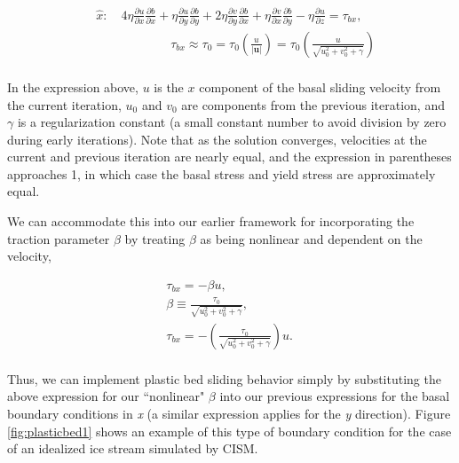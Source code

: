 \begin{align*}
  & \hat{x}:\quad 4\eta \frac{\partial u}{\partial x}\frac{\partial b}{\partial x}+\eta \frac{\partial u}{\partial y}\frac{\partial b}{\partial y}+2\eta \frac{\partial v}{\partial y}\frac{\partial b}{\partial x}+\eta \frac{\partial v}{\partial x}\frac{\partial b}{\partial y}-\eta \frac{\partial u}{\partial z}=\tau _{bx}, \\ 
 & \quad \quad \quad \quad \quad \quad \tau _{bx}\approx \tau _{0}=\tau _{0}\left( \frac{u}{\left| \mathbf{u} \right|} \right)=\tau _{0}\left( \frac{u}{\sqrt{u_{0}^{2}+v_{0}^{2}+\gamma }} \right) \\ 
\end{align*}

In the expression above, $u$ is the $x$ component of the basal sliding velocity from the current iteration, $u_0$ and $v_0$ are components from the previous iteration, and $\gamma$ is a regularization constant (a small constant number to avoid division by zero during early iterations). Note that as the solution converges, velocities at the current and previous iteration are nearly equal, and the expression in parentheses approaches 1, in which case the basal stress and yield stress are approximately equal. 

We can accommodate this into our earlier framework for incorporating the traction parameter $\beta$ by treating $\beta$ as being nonlinear and dependent on the velocity,

\begin{align*}
  & \tau _{bx}=-\beta u,\quad \quad  \\ 
 & \beta \equiv \frac{\tau _{0}}{\sqrt{u_{0}^{2}+v_{0}^{2}+\gamma }},\quad  \\ 
 & \tau _{bx}=-\left( \frac{\tau _{0}}{\sqrt{u_{0}^{2}+v_{0}^{2}+\gamma }} \right)u.\quad  \\
\end{align*}

Thus, we can implement plastic bed sliding behavior simply by substituting the above expression for our ``nonlinear" \textit{{\large \(\beta{}\)}} into our previous expressions for the basal boundary conditions in \textit{x} (a similar expression applies for the \textit{y} direction). 
Figure \ref{fig:plasticbed1} shows an example of this type of boundary condition for the case of an idealized ice stream simulated by CISM.

